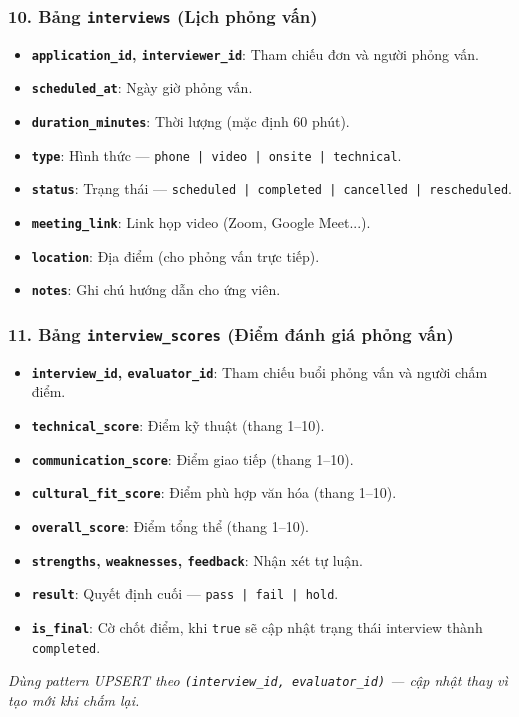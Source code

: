 \subsubsection*{10. Bảng \texttt{interviews} (Lịch phỏng vấn)}
\begin{itemize}
    \item \textbf{\texttt{application\_id}, \texttt{interviewer\_id}}: Tham chiếu đơn và người phỏng vấn.
    \item \textbf{\texttt{scheduled\_at}}: Ngày giờ phỏng vấn.
    \item \textbf{\texttt{duration\_minutes}}: Thời lượng (mặc định 60 phút).
    \item \textbf{\texttt{type}}: Hình thức --- \texttt{phone | video | onsite | technical}.
    \item \textbf{\texttt{status}}: Trạng thái --- \texttt{scheduled | completed | cancelled | rescheduled}.
    \item \textbf{\texttt{meeting\_link}}: Link họp video (Zoom, Google Meet...).
    \item \textbf{\texttt{location}}: Địa điểm (cho phỏng vấn trực tiếp).
    \item \textbf{\texttt{notes}}: Ghi chú hướng dẫn cho ứng viên.
\end{itemize}

\subsubsection*{11. Bảng \texttt{interview\_scores} (Điểm đánh giá phỏng vấn)}
\begin{itemize}
    \item \textbf{\texttt{interview\_id}, \texttt{evaluator\_id}}: Tham chiếu buổi phỏng vấn và người chấm điểm.
    \item \textbf{\texttt{technical\_score}}: Điểm kỹ thuật (thang 1--10).
    \item \textbf{\texttt{communication\_score}}: Điểm giao tiếp (thang 1--10).
    \item \textbf{\texttt{cultural\_fit\_score}}: Điểm phù hợp văn hóa (thang 1--10).
    \item \textbf{\texttt{overall\_score}}: Điểm tổng thể (thang 1--10).
    \item \textbf{\texttt{strengths}, \texttt{weaknesses}, \texttt{feedback}}: Nhận xét tự luận.
    \item \textbf{\texttt{result}}: Quyết định cuối --- \texttt{pass | fail | hold}.
    \item \textbf{\texttt{is\_final}}: Cờ chốt điểm, khi \texttt{true} sẽ cập nhật trạng thái interview thành \texttt{completed}.
\end{itemize}
\textit{Dùng pattern UPSERT theo \texttt{(interview\_id, evaluator\_id)} --- cập nhật thay vì tạo mới khi chấm lại.}

